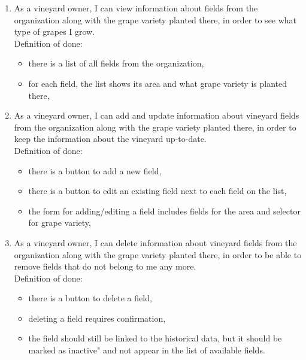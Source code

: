 \begin{enumerate}
	\item As a vineyard owner, I can view information about fields from the organization along with the grape variety planted there, in order to see what type of grapes I grow.
	\\Definition of done:
	\begin{itemize}
		\item there is a list of all fields from the organization,
		\item for each field, the list shows its area and what grape variety is planted there,
	\end{itemize}
	\item As a vineyard owner, I can add and update information about vineyard fields from the organization along with the grape variety planted there, in order to keep the information about the vineyard up-to-date.
	\\Definition of done:
	\begin{itemize}
		\item there is a button to add a new field,
		\item there is a button to edit an existing field next to each field on the list,
		\item the form for adding/editing a field includes fields for the area and selector for grape variety,
	\end{itemize}
	\item As a vineyard owner, I can delete information about vineyard fields from the organization along with the grape variety planted there, in order to be able to remove fields that do not belong to me any more.
	\\Definition of done:
	\begin{itemize}
		\item there is a button to delete a field,
		\item deleting a field requires confirmation,
		\item the field should still be linked to the historical data, but it should be marked as inactive" and not appear in the list of available fields.
	\end{itemize}
	

\end{enumerate}
